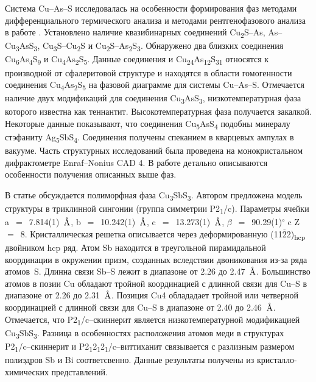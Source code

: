 Система Cu--As--S исследовалась на особенности формирования фаз методами дифференциального термического анализа и методами рентгенофазового анализа в работе \cite{Kurz_1989}. Установлено наличие квазибинарных соединений Cu\textsubscript{2}S--As, As--Cu\textsubscript{3}AsS\textsubscript{3}, Cu\textsubscript{3}S--Cu\textsubscript{2}S и Cu\textsubscript{2}S--As\textsubscript{2}S\textsubscript{3}. Обнаружено два близких соединения Cu\textsubscript{6}As\textsubscript{4}S\textsubscript{9} и Cu\textsubscript{4}As\textsubscript{2}S\textsubscript{5}. Данные соединения и Cu\textsubscript{24}As\textsubscript{12}S\textsubscript{31} относятся к производной от сфалеритовой структуре и находятся в области гомогенности соединения Cu\textsubscript{4}As\textsubscript{2}S\textsubscript{5} на фазовой диаграмме для системы  Cu--As--S. Отмечается наличие двух модификаций для соединения Cu\textsubscript{3}AsS\textsubscript{3}, низкотемпературная фаза которого известна как теннантит. Высокотемпературная фаза получается закалкой. Некоторые данные показывают, что соединения Cu\textsubscript{5}AsS\textsubscript{4} подобны минералу стэфаниту Ag\textsubscript{5}SbS\textsubscript{4}. Соединения получены спеканием в кварцевых ампулах в вакууме. Часть структурных исследований была проведена на монокристальном дифрактометре Enraf--Nonius CAD 4. В работе детально описываются особенности получения описанных выше фаз.

В статье \cite{Makovicky1995} обсуждается полиморфная фаза Cu\textsubscript{3}SbS\textsubscript{3}. Автором предложена модель  структуры в триклинной сингонии (группа симметрии P2\textsubscript{1}/c). Параметры ячейки a~$=$~7.814(1)~$\mbox{\normalfont\AA}$, b~$=$~10.242(1)~$\mbox{\normalfont\AA}$, c~$=$~13.273(1)~$\mbox{\normalfont\AA}$, $\beta$~$=$~90.29(1)\textsuperscript{$\circ$} c Z~$=$~8. Кристаллическая решетка описывается через деформированную (11$\overline{\!2}$2)\textsubscript{hcp} двойником hcp ряд. Атом Sb находится в треугольной пирамидальной координации в окружении призм, созданных вследствии двоникования из-за ряда атомов~S. Длинна связи Sb--S лежит в диапазоне от 2.26 до 2.47~$\mbox{\normalfont\AA}$. Большинство атомов в позии Cu обладают тройной координацией с длинной связи для Cu--S в диапазоне от 2.26 до 2.31~$\mbox{\normalfont\AA}$. Позиция Cu4 облададает тройной или четверной координацией с длинной связи для Cu--S в диапазоне от 2.40 до 2.46~$\mbox{\normalfont\AA}$. Отмечается, что P2\textsubscript{1}/c--скиннерит является низкотемпературной модификацией Cu\textsubscript{3}SbS\textsubscript{3}. Разница в особенностях расположения атомов меди в структурах P2\textsubscript{1}/c--скиннерит и P2\textsubscript{1}2\textsubscript{1}2\textsubscript{1}/c--виттиханит связывается с разлизным размером полиэдров Sb и Bi соответсвенно. Данные результаты получены из кристалло-химических представлений. 

